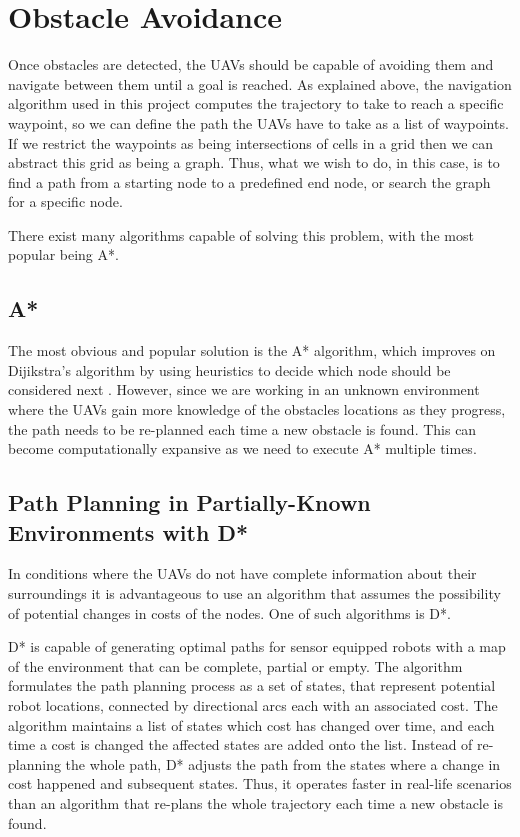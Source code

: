 \section{Obstacle Avoidance}

Once obstacles are detected, the UAVs should be capable of avoiding them and navigate between them 
until a goal is reached. As explained above, the navigation algorithm used in this project computes
the trajectory to take to reach a specific waypoint, so we can define the path the UAVs have to take
as a list of waypoints. If we restrict the waypoints as being intersections of cells in a grid then
we can abstract this grid as being a graph. Thus, what we wish to do, in this case, is to find a path
from a starting node to a predefined end node, or search the graph for a specific node. 

There exist many algorithms capable of solving this problem, with the most popular being A*.


\subsection{A*}

The most obvious and popular solution is the A* algorithm, which improves on Dijikstra's algorithm
by using heuristics to decide which node should be considered next \autocite{ADA}. However, since we 
are working in an unknown environment where the UAVs gain more knowledge of the obstacles locations as
they progress, the path needs to be re-planned each time a new obstacle is found. This can become
computationally expansive as we need to execute A* multiple times. 

\subsection{Path Planning in Partially-Known Environments with D*}

In conditions where the UAVs do not have complete information about their surroundings it is 
advantageous to use an algorithm that assumes the possibility of potential changes in costs of the nodes. 
One of such algorithms is D*. 

D* is capable of generating optimal paths for sensor equipped robots with a map of the environment that 
can be complete, partial or empty. The algorithm formulates the path planning process as a set of states,
that represent potential robot locations, connected by directional arcs each with an associated cost. The 
algorithm maintains a list of states which cost has changed over time, and each time a cost is changed
the affected states are added onto the list. Instead of re-planning the whole path, D* adjusts the path
from the states where a change in cost happened and subsequent states. Thus, it operates faster in real-life
scenarios than an algorithm that re-plans the whole trajectory each time a new obstacle is found. \autocite{AS94}

